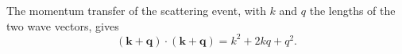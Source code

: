 \documentclass{article}
\begin{document}
The momentum transfer of the scattering event, with $k$ and $q$ the lengths of the two wave vectors, gives
\begin{equation}
(\mathbf{k}+\mathbf{q})\cdot(\mathbf{k}+\mathbf{q}) = k^2 + 2 k q + q^2 .
\label{eq:kq}
\end{equation}
\end{document}
